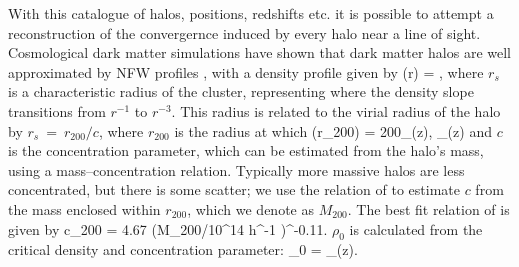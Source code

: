 \documentclass[useAMS,usenatbib]{mn2e}
\begin{document}
With this catalogue of halos, positions, redshifts etc. it is possible to attempt
a reconstruction of the convergernce induced by every halo near a line of sight.
Cosmological dark matter simulations have shown that dark matter halos are well
approximated by NFW profiles \citep{NFW1997}, with a density profile given by
\be\label{eq:rhonfw}
\rho(r) = 
,
\ee
where $r_{s}$ is a characteristic radius of the cluster, representing where
the density slope transitions from $r^{-1}$ to $r^{-3}$. This radius is related
to the virial radius of the halo by $r_{s}~=~r_{200}/c$, where $r_{200}$ is the radius at 
which 
\be
\rho(r_{200}) = 200\rho_{{}}(z),  \rho_{}(z) \equiv {}
\ee
and $c$ is the concentration parameter, which can be estimated from the halo's mass,
using a mass--concentration relation. Typically more massive halos are less concentrated,
but there is some scatter; we use the relation of \citet{neto2007} to estimate $c$
from the mass enclosed within $r_{200}$, which we denote as $M_{200}$. The best fit relation of \citet{neto2007} is given by
\be
c_{200} = 4.67 (M_{200}/10^{14} h^{-1} \Msun)^{-0.11}.
\ee
$\rho_0$ is calculated from the critical density and concentration parameter:
\be
\rho_0 = \rho_{}(z).
\ee
\end{document}
